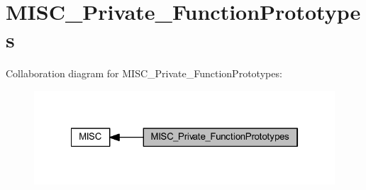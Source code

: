 \hypertarget{group___m_i_s_c___private___function_prototypes}{}\section{M\+I\+S\+C\+\_\+\+Private\+\_\+\+Function\+Prototypes}
\label{group___m_i_s_c___private___function_prototypes}
Collaboration diagram for M\+I\+S\+C\+\_\+\+Private\+\_\+\+Function\+Prototypes\+:
\nopagebreak
\begin{figure}[H]
\begin{center}
\leavevmode
\includegraphics[width=322pt]{group___m_i_s_c___private___function_prototypes}
\end{center}
\end{figure}
